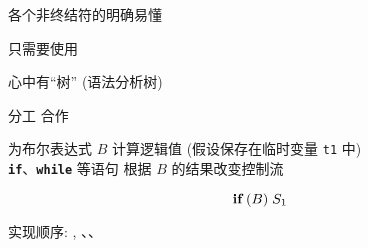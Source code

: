 
\begin{frame}{}
  \begin{center}
    各个非终结符的明确易懂

    \vspace{0.30cm}
    \vspace{0.30cm}

    只需要使用
  \end{center}
\end{frame}

\begin{frame}
  \begin{center}
    心中有``树'' (语法分析树)
  \end{center}
\end{frame}

\begin{frame}{}
  \begin{center}
    {\Large 分工 \qquad 合作}

    \vspace{0.20cm}
  \end{center}

  \begin{center}
    为布尔表达式 $B$ 计算逻辑值 (假设保存在临时变量 \texttt{t1} 中) \\[5pt]
    \texttt{\bf if}、\texttt{\bf while} 等语句
    根据 $B$ 的结果改变控制流
  \end{center}

  \vspace{-0.30cm}
  \[
    \texttt{\bf if}\; (B)\; S_{1}
  \]
\end{frame}

\begin{frame}{}
  \begin{center}

    \vspace{0.30cm}
  \end{center}
\end{frame}

\begin{frame}
  \begin{center}
    实现顺序: ,
      、、
  \end{center}

  \begin{columns}
  \end{columns}
\end{frame}


